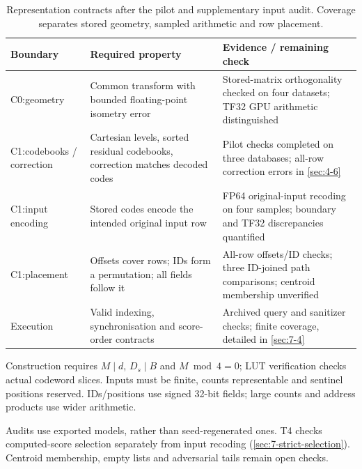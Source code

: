 \begin{table}[tbp]
\centering
\caption[Representation contracts and audit coverage]{Representation contracts after the pilot and supplementary input audit.
Coverage separates stored geometry, sampled arithmetic and row placement.}
\label{tab:4-contracts}
\footnotesize\setlength{\tabcolsep}{4pt}
\begin{tabularx}{\linewidth}{@{}>{\raggedright\arraybackslash}p{1.8cm}*{2}{>{\raggedright\arraybackslash}X}@{}}
\toprule
Boundary & Required property & Evidence / remaining check \\
\midrule
C0:\newline geometry & Common transform with bounded floating-point isometry error & Stored-matrix orthogonality checked on four datasets; TF32 GPU arithmetic distinguished \\
C1:\newline codebooks / correction & Cartesian levels, sorted residual codebooks, correction matches decoded codes & Pilot checks completed on three databases; all-row correction errors in \cref{sec:4-6} \\
C1:\newline input encoding & Stored codes encode the intended original input row & FP64 original-input recoding on four samples; boundary and TF32 discrepancies quantified \\
C1:\newline placement & Offsets cover rows; IDs form a permutation; all fields follow it & All-row offsets/ID checks; three ID-joined path comparisons; centroid membership unverified \\
Execution & Valid indexing, synchronisation and score-order contracts & Archived query and sanitizer checks; finite coverage, detailed in \cref{sec:7-4} \\
\bottomrule
\end{tabularx}
\end{table}

Construction requires $M\mid d$, $D_s\mid B$ and $M\bmod4=0$;
LUT verification checks actual codeword slices. Inputs must be finite,
counts representable and sentinel positions reserved. IDs/positions use
signed 32-bit fields; large counts and address products use wider arithmetic.

Audits use exported models, rather than seed-regenerated ones. T4 checks
computed-score selection separately from input recoding
(\cref{sec:7-strict-selection}). Centroid membership, empty lists and
adversarial tails remain open checks.
